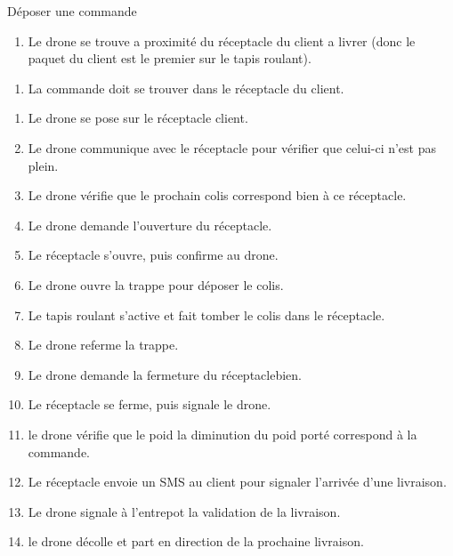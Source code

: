 ﻿\begin{UseCase}{Déposer une commande}



\begin{UseCasePre}
    \begin{enumerate}
        \item Le drone se trouve a proximité du réceptacle du client a livrer
            (donc le paquet du client est le premier sur le tapis roulant).
    \end{enumerate}
\end{UseCasePre}

\begin{UseCasePost}
    \begin{enumerate}
        \item La commande doit se trouver dans le réceptacle du client.
    \end{enumerate}
\end{UseCasePost}

\begin{UseCaseScenario}
    \begin{enumerate}
        \item Le drone se pose sur le réceptacle client.
        \item Le drone communique avec le réceptacle pour vérifier que celui-ci
            n'est pas plein.
        \item Le drone vérifie que le prochain colis correspond bien à ce
            réceptacle.
        \item Le drone demande l'ouverture du réceptacle.
        \item Le réceptacle s'ouvre, puis confirme au drone.
        \item Le drone ouvre la trappe pour déposer le colis.
        \item Le tapis roulant s'active et fait tomber le colis dans le
            réceptacle.
        \item Le drone referme la trappe.
        \item Le drone demande la fermeture du réceptaclebien.
        \item Le réceptacle se ferme, puis signale le drone.
        \item le drone vérifie que le poid la diminution du poid porté
            correspond à la commande.
        \item Le réceptacle envoie un SMS au client pour signaler l'arrivée
            d'une livraison.
        \item Le drone signale à l'entrepot la validation de la livraison.
        \item le drone décolle et part en direction de la prochaine livraison.
    \end{enumerate}
\end{UseCaseScenario}


\end{UseCase}
